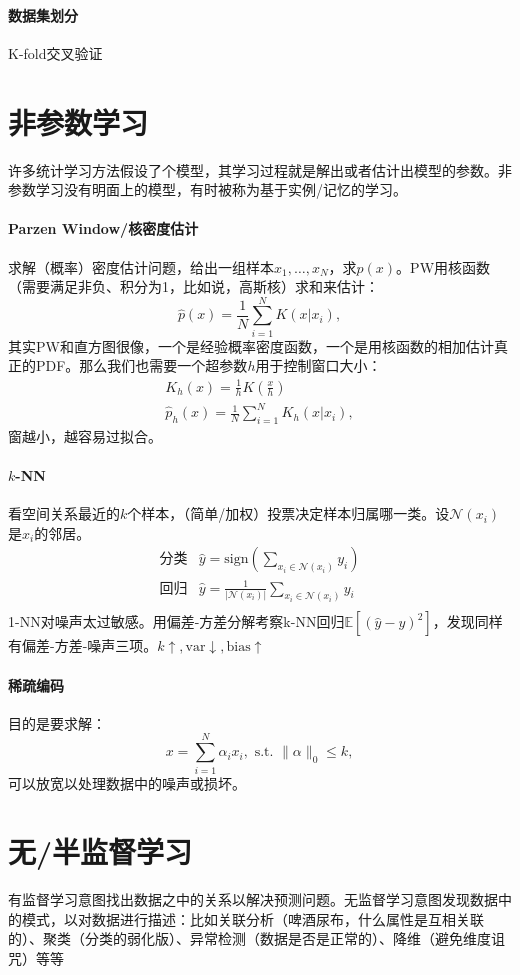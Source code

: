 \paragraph{数据集划分} K-fold交叉验证

\section{非参数学习}
许多统计学习方法假设了个模型，其学习过程就是解出或者估计出模型的参数。非参数学习没有明面上的模型，有时被称为基于实例/记忆的学习。
\paragraph{Parzen Window/核密度估计}
求解（概率）密度估计问题，给出一组样本$x_1,\ldots,x_N$，求$p(x)$。PW用核函数（需要满足非负、积分为1，比如说，高斯核）求和来估计：
$$\hat{p}(x) = \frac{1}{N}\sum^N_{i=1}K(x|x_i),$$
其实PW和直方图很像，一个是经验概率密度函数，一个是用核函数的相加估计真正的PDF。那么我们也需要一个超参数$h$用于控制窗口大小：
$$
\begin{array}{l}
K_h(x) = \frac{1}{h}K(\frac{x}{h}) \\
\hat{p}_h(x) = \frac{1}{N}\sum^N_{i=1}K_h(x|x_i),
\end{array}
$$
窗越小，越容易过拟合。

\paragraph{$k$-NN}看空间关系最近的$k$个样本，（简单/加权）投票决定样本归属哪一类。设$\mathcal{N}(x_i)$是$x_i$的邻居。
$$
\begin{array}{ll}
\text{分类} & \hat{y} = \mathrm{sign}(\sum_{x_i \in \mathcal{N}(x_i)} y_i) \\
\text{回归} & \hat{y} = \frac{1}{|\mathcal{N}(x_i)|} \sum_{x_i \in \mathcal{N}(x_i)} y_i \\
\end{array}
$$
1-NN对噪声太过敏感。用偏差-方差分解考察k-NN回归$\mathbb{E}[(\hat{y} - y)^2]$，发现同样有偏差-方差-噪声三项。$k\uparrow,\text{var} \downarrow,\text{bias} \uparrow$

\paragraph{稀疏编码} 目的是要求解：
$$x = \sum^N_{i=1} \alpha_ix_i,\text{ s.t. } \|\alpha\|_0 \le k,$$
可以放宽以处理数据中的噪声或损坏。

\section{无/半监督学习}
有监督学习意图找出数据之中的关系以解决预测问题。无监督学习意图发现数据中的模式，以对数据进行描述：比如关联分析（啤酒尿布，什么属性是互相关联的）、聚类（分类的弱化版）、异常检测（数据是否是正常的）、降维（避免维度诅咒）等等

